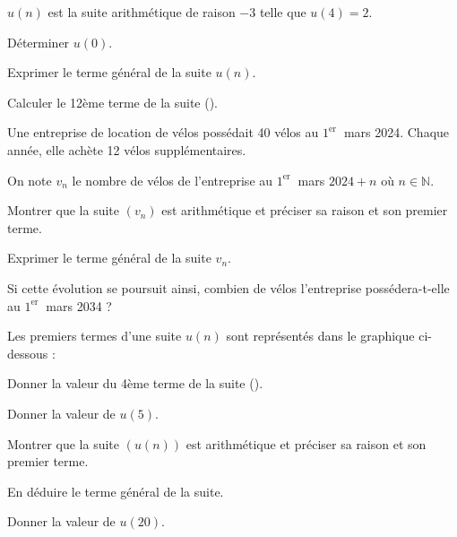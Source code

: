 \documentclass[11pt,a4paper]{article}  %
\begin{document}
\exerciceDS{}
$u(n)$ est la suite arithmétique de raison $-3$ telle que $u(4)=2$.
\begin{enumMet}
	\item Déterminer $u(0)$.
	\item Exprimer le terme général de la suite $u(n)$.
	\item Calculer le 12ème terme de la suite (\danger).
\end{enumMet}


\exerciceDS{}
Une entreprise de location de vélos possédait 40 vélos au $1^{\text {er }}$ mars 2024. Chaque année, elle achète 12 vélos supplémentaires.

On note $v_n$ le nombre de vélos de l'entreprise au $1^{\text {er }}$ mars $2024+n$ où $n \in \mathbb{N}$.
\begin{enumMet}
	\item Montrer que la suite $\left(v_n\right)$ est arithmétique et préciser sa raison et son premier terme.
	\item Exprimer le terme général de la suite $v_n$.
	\item Si cette évolution se poursuit ainsi, combien de vélos l'entreprise possédera-t-elle au $1^{\text {er }}$ mars 2034 ?
\end{enumMet}


\exerciceDS{}
Les premiers termes d'une suite $u(n)$ sont représentés dans le graphique ci-dessous :

\begin{center}
\end{center}

\begin{enumMet}
	\item Donner la valeur du 4ème terme de la suite (\danger).
	\item Donner la valeur de $u(5)$.
	\item Montrer que la suite $\left(u(n)\right)$ est arithmétique et préciser sa raison et son premier terme.
	\item En déduire le terme général de la suite.
	\item {} Donner la valeur de $u(20)$.
\end{enumMet}
\end{document}
